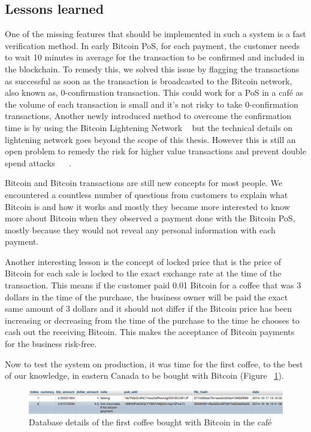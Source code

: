 \subsection{Lessons learned}
One of the missing features that should be implemented in such a system is a fast verification method. In early Bitcoin PoS, for each payment, the customer needs to wait 10 minutes in average for the transaction to be confirmed and included in the blockchain. To remedy this, we solved this issue by flagging the transactions as successful as soon as the transaction is broadcasted to the Bitcoin network, also known as, 0-confirmation transaction. This could work for a PoS in a caf\'{e} as the volume of each transaction is small and it's not risky to take 0-confirmation transactions, Another newly introduced method to overcome the confirmation time is by using the Bitcoin Lightening Network ~\cite{poon2015bitcoin} but the technical details on lightening network goes beyond the scope of this thesis. However this is still an open problem to remedy the risk for higher value transactions and prevent double spend attacks ~\cite{karame2012two} ~\cite{bamert2013have}. 

Bitcoin and Bitcoin transactions are still new concepts for most people. We encountered a countless number of questions from customers to explain what Bitcoin is and how it works and mostly they became more interested to know more about Bitcoin when they observed a payment done with the Bitcoin PoS, mostly because they would not reveal any personal information with each payment.

Another interesting lesson is the concept of locked price that is the price of Bitcoin for each sale is locked to the exact exchange rate at the time of the transaction. This means if the customer paid 0.01 Bitcoin for a coffee that was 3 dollars in the time of the purchase, the business owner will be paid the exact same amount of 3 dollars and it should not differ if the Bitcoin price has been increasing or decreasing from the time of the purchase to the time he chooses to cash out the receiving Bitcoin. This makes the acceptance of Bitcoin payments for the business risk-free.

Now to test the system on production, it was time for the first coffee, to the best of our knowledge, in eastern Canada to be bought with Bitcoin (Figure ~\ref{fig:firsttransaction}).

\begin{figure}[htb!p]
\centering
\includegraphics[width=\linewidth]{fig/first_cafe_transaction.png}
  \caption{Database details of the first coffee bought with Bitcoin in the caf\'{e}}
\label{fig:firsttransaction}
\end{figure}


